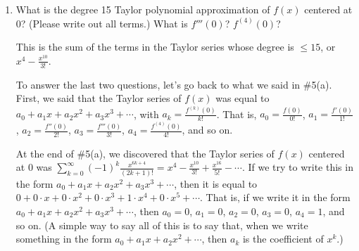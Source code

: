 \documentclass[main]{subfiles}
\begin{document}
\begin{enumerate}[resume]
\begin{enumerate}
  \item


  \begin{problem}[\vfill]
  What is the degree 15 Taylor polynomial approximation of $f(x)$
  centered at $0$?  (Please write out all terms.)   What is $f'''(0)$?  $f^{(4)}(0)$?
  \end{problem}

  \begin{solution}
  This is the sum of the terms in the Taylor series whose degree is
  $\leq 15$, or $\boxed{x^4 - \frac{x^{10}}{3!}}$. 
  
  To answer the last two questions, let's go back to what we said in
  {{\#5}(a)}.  First, we said that
  the Taylor series of $f(x)$ was equal to $a_0 + a_1 x + a_2 x^2 +
  a_3 x^3 + \cdots$, with $a_k = \frac{f^{(k)}(0)}{k!}$.  That is,
  $a_0 = \frac{f(0)}{0!}$, $a_1 = \frac{f'(0)}{1!}$, $a_2 =
  \frac{f''(0)}{2!}$, $a_3 = \frac{f'''(0)}{3!}$, $a_4 =
  \frac{f^{(4)}(0)}{4!}$, and so on.

  At the end of {{\#5}(a)}, we
  discovered that the Taylor series of $f(x)$ centered at 0 was
  $\displaystyle \sum_{k=0}^\infty (-1)^k \frac{x^{6k + 4}}{(2k + 1)!}
  = x^4 - \frac{x^{10}}{3!} + \frac{x^{16}}{5!} - \cdots$.  If we try
  to write this in the form $a_0 + a_1 x + a_2 x^2 + a_3 x^3 +
  \cdots$, then it is equal to $0 + 0 \cdot x + 0 \cdot x^2 + 0 \cdot
  x^3 + 1 \cdot x^4 + 0 \cdot x^5 + \cdots$.  That is, if we write it
  in the form $a_0 + a_1 x + a_2 x^2 + a_3 x^3 + \cdots$, then $a_0 =
  0$, $a_1 = 0$, $a_2 = 0$, $a_3 = 0$, $a_4 = 1$, and so on.  (A
  simple way to say all of this is to say that, when we write
  something in the form $a_0 + a_1 x + a_2 x^2 + \cdots$, then $a_k$
  is the coefficient of $x^k$.)


\end{solution}
\end{enumerate}
\end{enumerate}
\end{document}
